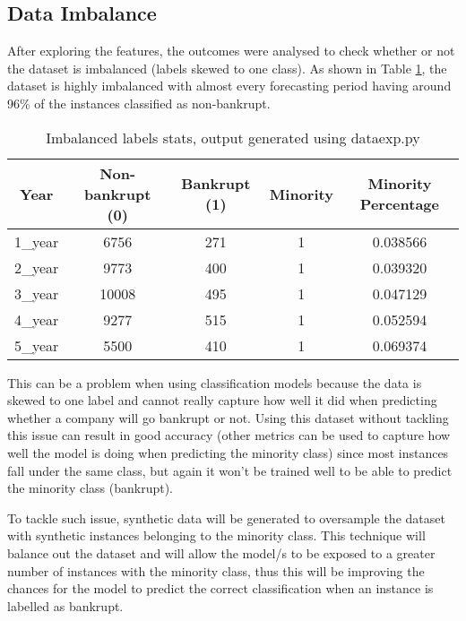 \subsection{Data Imbalance}\label{ssec:data_imb}

After exploring the features, the outcomes were analysed to check whether or not the dataset is imbalanced (labels skewed to one class). As shown in Table \ref{table:imb_labell}, the dataset is highly imbalanced with almost every forecasting period having around 96\% of the instances classified as non-bankrupt. 

\begin{table}[H]
\centering
\begin{tabular}{|c|c|c|c|c|}
\hline
\textbf{Year} & \textbf{Non-bankrupt (0)} & \textbf{Bankrupt (1)} & \textbf{Minority} & \textbf{Minority Percentage} \\ \hline
1\_year       & 6756                      & 271                   & 1                 & 0.038566                     \\ \hline
2\_year       & 9773                      & 400                   & 1                 & 0.039320                     \\ \hline
3\_year       & 10008                     & 495                   & 1                 & 0.047129                     \\ \hline
4\_year       & 9277                      & 515                   & 1                 & 0.052594                     \\ \hline
5\_year       & 5500                      & 410                   & 1                 & 0.069374                     \\ \hline
\end{tabular}
\caption{Imbalanced labels stats, output generated using dataexp.py}
\label{table:imb_labell}
\end{table}

\noindent This can be a problem when using classification models because the data is skewed to one label and cannot really capture how well it did when predicting whether a company will go bankrupt or not.  Using this dataset without tackling this issue can result in good accuracy (other metrics can be used to capture how well the model is doing when predicting the minority class) since most instances fall under the same class, but again it won’t be trained well to be able to predict the minority class (bankrupt). 

\noindent To tackle such issue, synthetic data will be generated to oversample the dataset with synthetic instances belonging to the minority class. This technique will balance out the dataset and will allow the model/s to be exposed to a greater number of instances with the minority class, thus this will be improving the chances for the model to predict the correct classification when an instance is labelled as bankrupt. 

